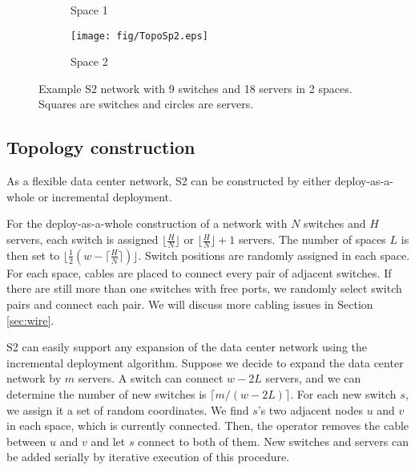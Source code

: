 \documentclass[10pt,conference]{IEEEtran}
\begin{document}
\begin{figure}[t]
\begin{subfigure}[b]{0.4\linewidth}
                \caption{Space 1}
                \label{fig:space1}
        \end{subfigure}\begin{subfigure}[b]{0.4\linewidth}
\texttt{[image: fig/TopoSp2.eps]}
                \vspace{-3ex}
                \caption{Space 2}
                \label{fig:space2}
        \end{subfigure}
        \vspace{-1ex}
        \caption{Example S2 network with 9 switches and 18 servers in 2 spaces. Squares are switches and circles are servers.}\label{fig:TopoExample}
        \vspace{-5ex}
\end{figure}


\subsection{Topology construction}

As a flexible data center network, S2 can be constructed by either deploy-as-a-whole or incremental deployment.


For the deploy-as-a-whole construction of a network with $N$ switches and $H$ servers, each switch is assigned  $\lfloor \frac{H}{N} \rfloor$ or $\lfloor \frac{H}{N} \rfloor + 1$
servers. The number of spaces $L$ is then set to $\lfloor \frac{1}{2} (w - \lceil \frac{H}{N} \rceil)\rfloor$.
Switch positions are randomly assigned in each space.
For each space, cables are placed to connect every pair of adjacent switches.
If there are still more than one switches with free ports, we randomly select switch pairs and connect each pair.
We will discuss more cabling issues in Section \ref{sec:wire}.






S2 can easily support any expansion of the data center network using the incremental deployment algorithm.
Suppose we decide to expand the data center network by $m$ servers.
A switch can connect $w-2L$ servers, and we can determine the number of new switches is $\lceil m/(w-2L) \rceil$.
For each new switch $s$, we assign it a set of random coordinates.
We find $s$'s two adjacent nodes $u$ and $v$ in each space, which is currently connected.
Then, the operator removes the cable between $u$ and $v$ and let $s$ connect to both of them.
New switches and servers can be added serially by iterative execution of this procedure.
\end{document}
